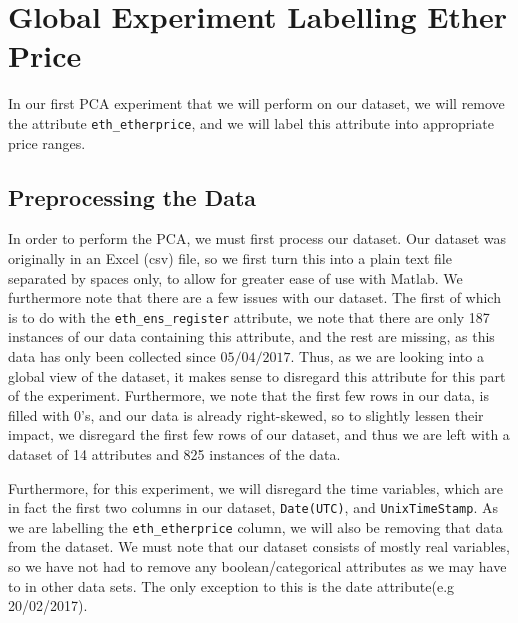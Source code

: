 \documentclass{article}
\begin{document}
\section{Global Experiment Labelling Ether Price}
In our first PCA experiment that we will perform on our dataset, we will remove the attribute \texttt{eth\_etherprice}, and we will label this attribute into appropriate price ranges.

\subsection{Preprocessing the Data}
In order to perform the PCA, we must first process our dataset. Our dataset was originally in an Excel (csv) file, so we first turn this into a plain text file separated by spaces only, to allow for greater ease of use with Matlab. We furthermore note that there are a few issues with our dataset. The first of which is to do with the \texttt{eth\_ens\_register} attribute, we note that there are only 187 instances of our data containing this attribute, and the rest are missing, as this data has only been collected since $05/04/2017$. Thus, as we are looking into a global view of the dataset, it makes sense to disregard this attribute for this part of the experiment. Furthermore, we note that the first few rows in our data, is filled with 0's, and our data is already right-skewed, so to slightly lessen their impact, we disregard the first few rows of our dataset, and thus we are left with a dataset of 14 attributes and 825 instances of the data.
\vspace{3mm}

Furthermore, for this experiment, we will disregard the time variables, which are in fact the first two columns in our dataset, \texttt{Date(UTC)}, and \texttt{UnixTimeStamp}. As we are labelling the \texttt{eth\_etherprice} column, we will also be removing that data from the dataset. We must note that our dataset consists of mostly real variables, so we have not had to remove any boolean/categorical attributes as we may have to in other data sets. The only exception to this is the date attribute(e.g 20/02/2017).
\vspace{3mm}
\end{document}

